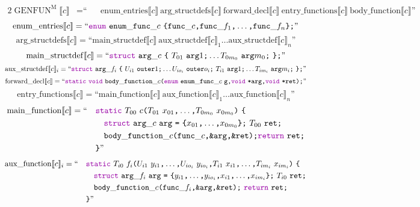 \documentclass[a4paper,fleqn]{article}
\newcommand{\BRA}[1]{\llbracket #1 \rrbracket}
\DeclareMathOperator{\genfunop}{GENFUN}
\newcommand{\genfunm}[1]{\genfunop^\mathrm{M}\BRA{#1}}
\newcommand{\enumentries}[1]{\mathrm{enum\_entries}\BRA{#1}}
\newcommand{\argstructdefs}[1]{\mathrm{arg\_structdefs}\BRA{#1}}
\newcommand{\mainstructdef}[1]{\mathrm{main\_structdef}\BRA{#1}}
\newcommand{\auxstructdef}[2]{\mathrm{aux\_structdef}\BRA{#1}_{#2}}
\newcommand{\forwarddecl}[1]{\mathrm{forward\_decl}\BRA{#1}}
\newcommand{\entryfunctions}[1]{\mathrm{entry\_functions}\BRA{#1}}
\newcommand{\mainfunction}[1]{\mathrm{main\_function}\BRA{#1}}
\newcommand{\auxfunction}[2]{\mathrm{aux\_function}\BRA{#1}_{#2}}
\newcommand{\bodyfunction}[1]{\mathrm{body\_function}\BRA{#1}}
\newcommand{\dq}[1]{\text{``}#1\text{''}}
\newcommand{\ttparen}[1]{\texttt{(}#1\texttt{)}}
\newcommand{\ttlbrace}{\texttt{\{}}
\newcommand{\ttrbrace}{\texttt{\}}}
\newcommand{\ttbrace}[1]{\texttt{\{}#1\texttt{\}}}
\newcommand{\tteq}{\texttt{=}}
\newcommand{\ttsemi}{\texttt{;}}
\newcommand{\ttcomma}{\texttt{,}}
\newcommand{\ttstar}{\texttt{*}}
\newcommand{\ttamp}{\texttt{\&}}
\newcommand{\kwstruct}{\mbox{\color{myviolet}\ttfamily struct}}
\newcommand{\kwvoid}{\mbox{\color{myviolet}\ttfamily void}}
\newcommand{\kwCreturn}{\mbox{\color{myviolet}\ttfamily return}}
\newcommand{\kwenum}{\mbox{\color{myviolet}\ttfamily enum}}
\newcommand{\kwstatic}{\mbox{\color{myviolet}\ttfamily static}}
\begin{document}
\begin{alignat*}{2}
  \genfunm{c} &= \text{``} && \enumentries{c}~\argstructdefs{c}~\forwarddecl{c}~\entryfunctions{c}~\bodyfunction{c} \text{''}
\end{alignat*}
\[ \enumentries{c} = \dq{\kwenum~\mathtt{enum\_func\_}c~\ttbrace{ \mathtt{func\_}c\ttcomma \mathtt{func\_}f_1\ttcomma \dots\ttcomma \mathtt{func\_}f_n }\ttsemi} \]
\[ \argstructdefs{c} = \dq{\mainstructdef{c}~\auxstructdef{c}{1} \dots \auxstructdef{c}{n}} \]
\[ \mainstructdef{c} = \dq{\kwstruct~\mathtt{arg\_}c~\ttbrace{~T_{01}~\mathtt{arg}1\ttsemi \dots T_{0m_0}~\mathtt{arg}m_0\ttsemi~}\ttsemi} \]
\[ \auxstructdef{c}{i} = \dq{\kwstruct~\mathtt{arg\_}f_i~\ttbrace{~U_{i1}~\mathtt{outer}1\ttsemi \dots U_{io_i}~\mathtt{outer}o_i\ttsemi~T_{i1}~\mathtt{arg}1\ttsemi \dots T_{im_i}~\mathtt{arg}m_i\ttsemi~}\ttsemi} \]
\[ \forwarddecl{c} = \dq{\kwstatic~\kwvoid~\mathtt{body\_function\_}c\ttparen{\kwenum~\mathtt{enum\_func\_}c~\mathtt{g}\ttcomma \kwvoid~\mathtt{\ttstar arg}\ttcomma \kwvoid~\mathtt{\ttstar ret}}\ttsemi} \]
\[ \entryfunctions{c} = \dq{\mainfunction{c}~\auxfunction{c}{1} \dots \auxfunction{c}{n}} \]
\begin{alignat*}{2}
  \mainfunction{c} &= \text{``} && \kwstatic~T_{00}~c\ttparen{T_{01}~x_{01}\ttcomma\dots\ttcomma T_{0m_0}~x_{0m_0}}~\ttlbrace \\
  & && \quad \kwstruct~\mathtt{arg\_}c~\mathtt{arg}~\tteq~\ttbrace{ x_{01}\ttcomma\dots\ttcomma x_{0m_0} }\ttsemi~T_{00}~\mathtt{ret}\ttsemi \\
  & && \quad \mathtt{body\_function\_}c\ttparen{\mathtt{func\_}c\ttcomma \ttamp\mathtt{arg}\ttcomma \ttamp\mathtt{ret}}\ttsemi \kwCreturn~\mathtt{ret}\ttsemi \\
  & && \ttrbrace \text{''}
\end{alignat*}
\begin{alignat*}{2}
  \auxfunction{c}{i} &= \text{``} && \kwstatic~T_{i0}~f_i\ttparen{U_{i1}~y_{i1}\ttcomma\dots\ttcomma U_{io_i}~y_{io_i}\ttcomma T_{i1}~x_{i1}\ttcomma\dots\ttcomma T_{im_i}~x_{im_i}}~\ttlbrace \\
  & && \quad \kwstruct~\mathtt{arg\_}f_i~\mathtt{arg}~\tteq~\ttbrace{ y_{i1}\ttcomma\dots\ttcomma y_{io_i}\ttcomma x_{i1}\ttcomma\dots\ttcomma x_{im_i} }\ttsemi~T_{i0}~\mathtt{ret}\ttsemi\\
  & && \quad \mathtt{body\_function\_}c\ttparen{\mathtt{func\_}f_i\ttcomma \ttamp\mathtt{arg}\ttcomma \ttamp\mathtt{ret}}\ttsemi~\kwCreturn~\mathtt{ret}\ttsemi \\
  & && \ttrbrace \text{''}
\end{alignat*}
\end{document}
